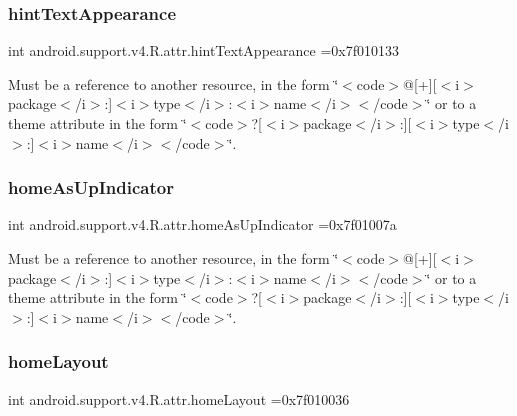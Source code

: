 \subsubsection{\texorpdfstring{hint\+Text\+Appearance}{hintTextAppearance}}
{\footnotesize\ttfamily int android.\+support.\+v4.\+R.\+attr.\+hint\+Text\+Appearance =0x7f010133\hspace{0.3cm}{\ttfamily [static]}}

Must be a reference to another resource, in the form \char`\"{}$<$code$>$@\mbox{[}+\mbox{]}\mbox{[}$<$i$>$package$<$/i$>$\+:\mbox{]}$<$i$>$type$<$/i$>$\+:$<$i$>$name$<$/i$>$$<$/code$>$\char`\"{} or to a theme attribute in the form \char`\"{}$<$code$>$?\mbox{[}$<$i$>$package$<$/i$>$\+:\mbox{]}\mbox{[}$<$i$>$type$<$/i$>$\+:\mbox{]}$<$i$>$name$<$/i$>$$<$/code$>$\char`\"{}. \mbox{\label{classandroid_1_1support_1_1v4_1_1R_1_1attr_a97ae31144cbfcae435daedba111ed06d}} 
\subsubsection{\texorpdfstring{home\+As\+Up\+Indicator}{homeAsUpIndicator}}
{\footnotesize\ttfamily int android.\+support.\+v4.\+R.\+attr.\+home\+As\+Up\+Indicator =0x7f01007a\hspace{0.3cm}{\ttfamily [static]}}

Must be a reference to another resource, in the form \char`\"{}$<$code$>$@\mbox{[}+\mbox{]}\mbox{[}$<$i$>$package$<$/i$>$\+:\mbox{]}$<$i$>$type$<$/i$>$\+:$<$i$>$name$<$/i$>$$<$/code$>$\char`\"{} or to a theme attribute in the form \char`\"{}$<$code$>$?\mbox{[}$<$i$>$package$<$/i$>$\+:\mbox{]}\mbox{[}$<$i$>$type$<$/i$>$\+:\mbox{]}$<$i$>$name$<$/i$>$$<$/code$>$\char`\"{}. \mbox{\label{classandroid_1_1support_1_1v4_1_1R_1_1attr_aea252ac5ec97a6ebd1e1f4b2ab6d36b2}} 
\subsubsection{\texorpdfstring{home\+Layout}{homeLayout}}
{\footnotesize\ttfamily int android.\+support.\+v4.\+R.\+attr.\+home\+Layout =0x7f010036\hspace{0.3cm}{\ttfamily [static]}}

